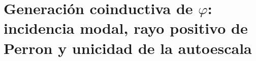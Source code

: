 \chapter{Generación coinductiva de \(\varphi\): incidencia modal, rayo positivo de Perron y unicidad de la autoescala}
\label{chap:p3-final:30:generacion_phi}

